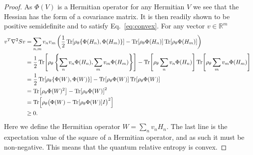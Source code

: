 \documentclass[
    aps,
    prx,
    onecolumn
]{revtex4-2}
\begin{document}
\begin{proof}
As $ \Phi(V)$ is a Hermitian operator for any Hermitian $V$ we see that the Hessian has the form of a covariance matrix. It is then readily shown to be positive semidefinite and to satisfy Eq.~\eqref{eq:convex}. For any vector $v \in \mathbb{R}^m$
\begin{align}
\begin{split}
\label{eq:positive_semidefinite}
    v^T \nabla^2 S v &=  \sum_{n,m} v_n v_m \left( \frac{1}{2} \Tr[ \rho_\theta \{ \Phi(H_n), \Phi(H_m) \}] - \Tr[ \rho_\theta \Phi(H_n)] \Tr[ \rho_\theta \Phi(H_m)] \right) \\
    &= \frac{1}{2} \Tr[ \rho_\theta \left\{ \sum_n v_n \Phi(H_n), \sum_m v_m \Phi(H_m) \right\}] - \Tr[ \rho_\theta \sum_n v_n \Phi(H_n)] \Tr[ \rho_\theta \sum_m v_m \Phi(H_m)] \\
    &= \frac{1}{2} \Tr[ \rho_\theta \{ \Phi(W), \Phi(W) \}] - \Tr[ \rho_\theta \Phi(W)] \Tr[ \rho_\theta \Phi(W)] \\
    &= \Tr[ \rho_\theta \Phi(W)^2 ] - \Tr[ \rho_\theta \Phi(W)]^2 \\
    &= \Tr[ \rho_\theta \big( \Phi(W) - \Tr[ \rho_\theta \Phi(W)] I \big )^2 ] \\
    &\geq 0 .
\end{split}
\end{align} 
Here we define the Hermitian operator $W = \sum_n v_n H_n$. The last line is the expectation value of the square of a Hermitian operator, and as such it must be non-negative. This means that the quantum relative entropy is convex. 


\end{proof}
\end{document}
